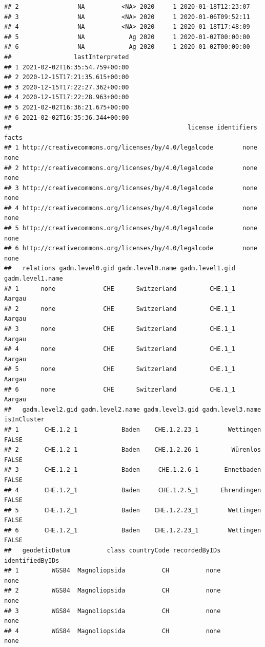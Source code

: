 \documentclass[
]{book}
\begin{document}
\begin{verbatim}
## 2                NA          <NA> 2020     1 2020-01-18T12:23:07
## 3                NA          <NA> 2020     1 2020-01-06T09:52:11
## 4                NA          <NA> 2020     1 2020-01-18T17:48:09
## 5                NA            Ag 2020     1 2020-01-02T00:00:00
## 6                NA            Ag 2020     1 2020-01-02T00:00:00
##                 lastInterpreted
## 1 2021-02-02T16:35:54.759+00:00
## 2 2020-12-15T17:21:35.615+00:00
## 3 2020-12-15T17:22:27.362+00:00
## 4 2020-12-15T17:22:28.963+00:00
## 5 2021-02-02T16:36:21.675+00:00
## 6 2021-02-02T16:35:36.344+00:00
##                                                license identifiers facts
## 1 http://creativecommons.org/licenses/by/4.0/legalcode        none  none
## 2 http://creativecommons.org/licenses/by/4.0/legalcode        none  none
## 3 http://creativecommons.org/licenses/by/4.0/legalcode        none  none
## 4 http://creativecommons.org/licenses/by/4.0/legalcode        none  none
## 5 http://creativecommons.org/licenses/by/4.0/legalcode        none  none
## 6 http://creativecommons.org/licenses/by/4.0/legalcode        none  none
##   relations gadm.level0.gid gadm.level0.name gadm.level1.gid gadm.level1.name
## 1      none             CHE      Switzerland         CHE.1_1           Aargau
## 2      none             CHE      Switzerland         CHE.1_1           Aargau
## 3      none             CHE      Switzerland         CHE.1_1           Aargau
## 4      none             CHE      Switzerland         CHE.1_1           Aargau
## 5      none             CHE      Switzerland         CHE.1_1           Aargau
## 6      none             CHE      Switzerland         CHE.1_1           Aargau
##   gadm.level2.gid gadm.level2.name gadm.level3.gid gadm.level3.name isInCluster
## 1       CHE.1.2_1            Baden    CHE.1.2.23_1        Wettingen       FALSE
## 2       CHE.1.2_1            Baden    CHE.1.2.26_1         Würenlos       FALSE
## 3       CHE.1.2_1            Baden     CHE.1.2.6_1       Ennetbaden       FALSE
## 4       CHE.1.2_1            Baden     CHE.1.2.5_1      Ehrendingen       FALSE
## 5       CHE.1.2_1            Baden    CHE.1.2.23_1        Wettingen       FALSE
## 6       CHE.1.2_1            Baden    CHE.1.2.23_1        Wettingen       FALSE
##   geodeticDatum          class countryCode recordedByIDs identifiedByIDs
## 1         WGS84  Magnoliopsida          CH          none            none
## 2         WGS84  Magnoliopsida          CH          none            none
## 3         WGS84  Magnoliopsida          CH          none            none
## 4         WGS84  Magnoliopsida          CH          none            none

\end{verbatim}
\end{document}
